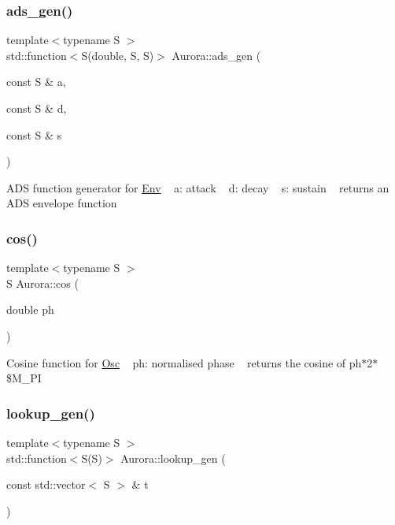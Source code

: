 \subsubsection{\texorpdfstring{ads\+\_\+gen()}{ads\_gen()}}
{\footnotesize\ttfamily template$<$typename S $>$ \\
std\+::function$<$S(double, S, S)$>$ Aurora\+::ads\+\_\+gen (\begin{DoxyParamCaption}\item[{const S \&}]{a,  }\item[{const S \&}]{d,  }\item[{const S \&}]{s }\end{DoxyParamCaption})}

A\+DS function generator for \hyperlink{class_aurora_1_1_env}{Env} ~\newline
a\+: attack ~\newline
d\+: decay ~\newline
s\+: sustain ~\newline
returns an A\+DS envelope function \mbox{\label{namespace_aurora_ab6ef1b966b8f27d107fcabe1027a677a}} 
\subsubsection{\texorpdfstring{cos()}{cos()}}
{\footnotesize\ttfamily template$<$typename S $>$ \\
S Aurora\+::cos (\begin{DoxyParamCaption}\item[{double}]{ph }\end{DoxyParamCaption})}

Cosine function for \hyperlink{class_aurora_1_1_osc}{Osc} ~\newline
ph\+: normalised phase ~\newline
returns the cosine of ph$\ast$2$\ast$\$\+M\+\_\+\+PI \mbox{\label{namespace_aurora_ade912bee8dbe0351b2193809ce592d8b}} 
\subsubsection{\texorpdfstring{lookup\+\_\+gen()}{lookup\_gen()}}
{\footnotesize\ttfamily template$<$typename S $>$ \\
std\+::function$<$S(S)$>$ Aurora\+::lookup\+\_\+gen (\begin{DoxyParamCaption}\item[{const std\+::vector$<$ S $>$ \&}]{t }\end{DoxyParamCaption})}

